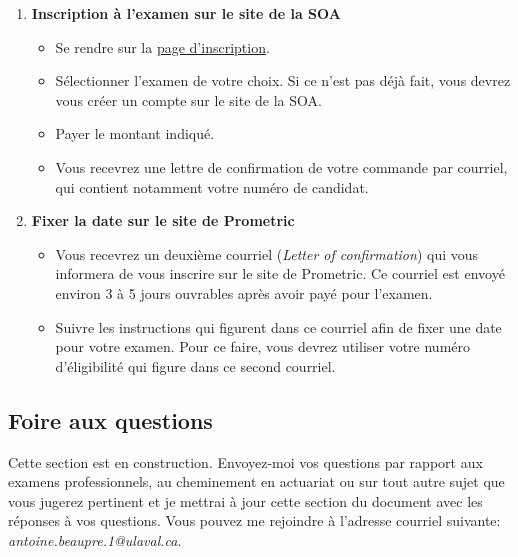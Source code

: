 \documentclass[11pt,french]{article}
\begin{document}
\begin{enumerate}
\item \textbf{Inscription à l'examen sur le site de la SOA}
\begin{itemize}
\item Se rendre sur la \href{https://www.soa.org/Education/Exam-Req/Registration/edu-registration.aspx}{page d'inscription}. 
\item Sélectionner l'examen de votre choix. Si ce n'est pas déjà fait, vous devrez vous créer un compte sur le site de la SOA.
\item Payer le montant indiqué.
\item Vous recevrez une lettre de confirmation de votre commande par courriel, qui contient notamment votre numéro de candidat.
\end{itemize}\vspace{\baselineskip}

\item \textbf{Fixer la date sur le site de Prometric}
\begin{itemize}
\item Vous recevrez un deuxième courriel (\textit{Letter of confirmation}) qui vous informera de vous inscrire sur le site de Prometric. Ce courriel est envoyé environ 3 à 5 jours ouvrables après avoir payé pour l'examen.
\item Suivre les instructions qui figurent dans ce courriel afin de fixer une date pour votre examen. Pour ce faire, vous devrez utiliser votre numéro d'éligibilité qui figure dans ce second courriel.
\end{itemize}
\end{enumerate}

\newpage
\subsection*{Foire aux questions}
\label{subsec:faq}
Cette section est en construction. Envoyez-moi vos questions par rapport aux examens professionnels, au cheminement en actuariat ou sur tout autre sujet que vous jugerez pertinent et je mettrai à jour cette section du document avec les réponses à vos questions. Vous pouvez me rejoindre à l'adresse courriel suivante: \emph{antoine.beaupre.1@ulaval.ca}.
\end{document}
